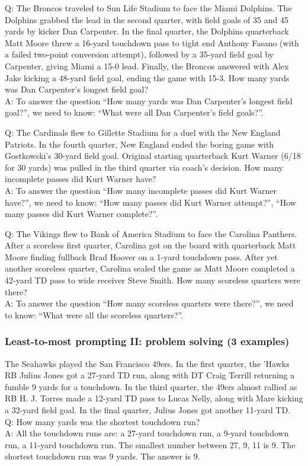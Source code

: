 Q: The Broncos traveled to Sun Life Stadium to face the Miami Dolphins. The Dolphins grabbed the lead in the second quarter, with field goals of 35 and 45 yards by kicker Dan Carpenter. In the final quarter, the Dolphins quarterback Matt Moore threw a 16-yard touchdown pass to tight end Anthony Fasano (with a failed two-point conversion attempt), followed by a 35-yard field goal by Carpenter, giving Miami a 15-0 lead. Finally, the Broncos answered with Alex Jake kicking a 48-yard field goal, ending the game with 15-3. How many yards was Dan Carpenter's longest field goal? \\
A: To answer the question ``How many yards was Dan Carpenter's longest field goal?'', we need to know: ``What were all Dan Carpenter's field goals?''.

Q: The Cardinals flew to Gillette Stadium for a duel with the New England Patriots. In the fourth quarter, New England ended the boring game with Gostkowski's 30-yard field goal. Original starting quarterback Kurt Warner (6/18 for 30 yards) was pulled in the third quarter via coach's decision. How many incomplete passes did Kurt Warner have? \\
A: To answer the question ``How many incomplete passes did Kurt Warner have?'', we need to know: ``How many passes did Kurt Warner attempt?'', ``How many passes did Kurt Warner complete?''.

Q: The Vikings flew to Bank of America Stadium to face the Carolina Panthers. After a scoreless first quarter, Carolina got on the board with quarterback Matt Moore finding fullback Brad Hoover on a 1-yard touchdown pass. After yet another scoreless quarter, Carolina sealed the game as Matt Moore completed a 42-yard TD pass to wide receiver Steve Smith. How many scoreless quarters were there? \\
A: To answer the question ``How many scoreless quarters were there?'', we need to know: ``What were all the scoreless quarters?''.

\subsubsection{Least-to-most prompting II: problem solving (3 examples)}

The Seahawks played the San Francisco 49ers. In the first quarter, the 'Hawks RB Julius Jones got a 27-yard TD run, along with DT Craig Terrill returning a fumble 9 yards for a touchdown. In the third quarter, the 49ers almost rallied as RB H. J. Torres made a 12-yard TD pass to Lucas Nelly, along with Mare kicking a 32-yard field goal. In the final quarter, Julius Jones got another 11-yard TD. \\
Q: How many yards was the shortest touchdown run? \\
A: All the touchdown runs are: a 27-yard touchdown run, a 9-yard touchdown run, a 11-yard touchdown run. The smallest number between 27, 9, 11 is 9. The shortest touchdown run was 9 yards. The answer is 9.

